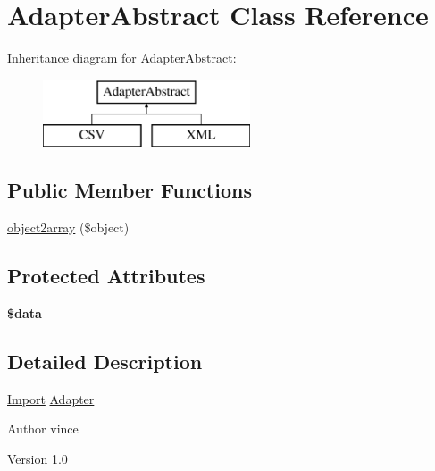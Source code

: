 \hypertarget{class_anemo_1_1_import_1_1_adapter_1_1_adapter_abstract}{
\section{AdapterAbstract Class Reference}
\label{class_anemo_1_1_import_1_1_adapter_1_1_adapter_abstract}
}
Inheritance diagram for AdapterAbstract:\begin{figure}[H]
\begin{center}
\leavevmode
\includegraphics[height=2.000000cm]{class_anemo_1_1_import_1_1_adapter_1_1_adapter_abstract}
\end{center}
\end{figure}
\subsection*{Public Member Functions}
\begin{DoxyCompactItemize}
\item 
\hyperlink{class_anemo_1_1_import_1_1_adapter_1_1_adapter_abstract_a3ea37674f372750988a16e9d728b4055}{object2array} (\$object)
\end{DoxyCompactItemize}
\subsection*{Protected Attributes}
\begin{DoxyCompactItemize}
\item 
\hypertarget{class_anemo_1_1_import_1_1_adapter_1_1_adapter_abstract_a6efc15b5a2314dd4b5aaa556a375c6d6}{
{\bfseries \$data}}
\label{class_anemo_1_1_import_1_1_adapter_1_1_adapter_abstract_a6efc15b5a2314dd4b5aaa556a375c6d6}

\end{DoxyCompactItemize}


\subsection{Detailed Description}
\hyperlink{class_anemo_1_1_import}{Import} \hyperlink{namespace_anemo_1_1_import_1_1_adapter}{Adapter}  \begin{DoxyAuthor}{Author}
vince 
\end{DoxyAuthor}
\begin{DoxyVersion}{Version}
1.0 
\end{DoxyVersion}


